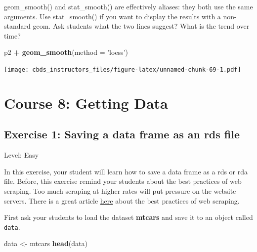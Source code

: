 \documentclass[]{book}
\newenvironment{Shaded}{\begin{snugshade}}{\end{snugshade}}
\newcommand{\DataTypeTok}[1]{\textcolor[rgb]{0.13,0.29,0.53}{#1}}
\newcommand{\KeywordTok}[1]{\textcolor[rgb]{0.13,0.29,0.53}{\textbf{#1}}}
\newcommand{\NormalTok}[1]{#1}
\newcommand{\OperatorTok}[1]{\textcolor[rgb]{0.81,0.36,0.00}{\textbf{#1}}}
\newcommand{\StringTok}[1]{\textcolor[rgb]{0.31,0.60,0.02}{#1}}
\begin{document}
geom\_smooth() and stat\_smooth() are effectively aliases: they both use the same arguments. Use stat\_smooth() if you want to display the results with a non-standard geom. Ask students what the two lines suggest? What is the trend over time?

\begin{Shaded}
\begin{Highlighting}[]
\NormalTok{p2 }\OperatorTok{+}\StringTok{ }\KeywordTok{geom_smooth}\NormalTok{(}\DataTypeTok{method =} \StringTok{'loess'}\NormalTok{)}
\end{Highlighting}
\end{Shaded}

\texttt{[image: cbds\_instructors\_files/figure-latex/unnamed-chunk-69-1.pdf]}

\hypertarget{getting-data}{%
\chapter*{Course 8: Getting Data}\label{getting-data}}

\hypertarget{exercise-1-saving-a-data-frame-as-an-rds-file}{%
\section*{Exercise 1: Saving a data frame as an rds file}\label{exercise-1-saving-a-data-frame-as-an-rds-file}}

Level: Easy

In this exercise, your student will learn how to save a data frame as a rds or rda file. Before, this exercise remind your students about the best practices of web scraping. Too much scraping at higher rates will put pressure on the website servers. There is a great article \href{https://www.scrapehero.com/how-to-prevent-getting-blacklisted-while-scraping/}{here} about the best practices of web scraping.

First ask your students to load the dataset \textbf{mtcars} and save it to an object called \texttt{data}.

\begin{Shaded}
\begin{Highlighting}[]
\NormalTok{data <-}\StringTok{ }\NormalTok{mtcars}
\KeywordTok{head}\NormalTok{(data)}
\end{Highlighting}
\end{Shaded}
\end{document}

